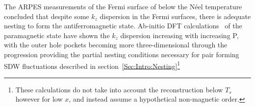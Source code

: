 The \ac{ARPES} measurements of the Fermi surface of \BaFeAs below the N\'eel temperature concluded that despite some $k_z$ dispersion in the Fermi surfaces, there is adequate nesting to form the antiferromagnetic state. Ab-initio DFT calculations~\cite{Shishido2010} of the paramagnetic state have shown the $k_z$ dispersion increasing with increasing P, with the outer hole pockets becoming more three-dimensional through the progression providing the partial nesting conditions necessary for pair forming \ac{SDW} fluctuations described in section~\ref{Sec:Intro:Nesting}\footnote{These calculations do not take into account the reconstruction below $T_s$ however for low $x$, and instead assume a hypothetical non-magnetic order.}



